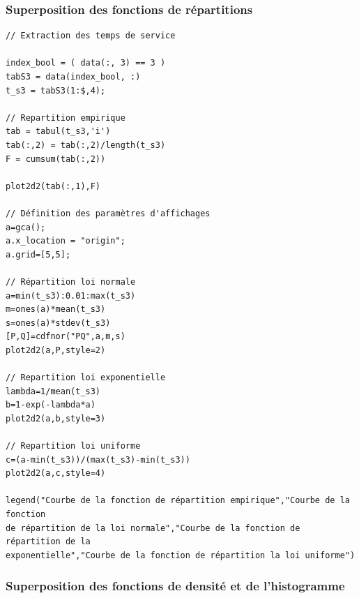 \documentclass{article}
\begin{document}
\subsubsection{Superposition des fonctions de répartitions}
\begin{verbatim}
// Extraction des temps de service

index_bool = ( data(:, 3) == 3 )
tabS3 = data(index_bool, :)
t_s3 = tabS3(1:$,4);

// Repartition empirique
tab = tabul(t_s3,'i')
tab(:,2) = tab(:,2)/length(t_s3)
F = cumsum(tab(:,2))

plot2d2(tab(:,1),F)

// Définition des paramètres d'affichages
a=gca();
a.x_location = "origin";
a.grid=[5,5];

// Répartition loi normale
a=min(t_s3):0.01:max(t_s3)
m=ones(a)*mean(t_s3)
s=ones(a)*stdev(t_s3)
[P,Q]=cdfnor("PQ",a,m,s)
plot2d2(a,P,style=2)

// Repartition loi exponentielle
lambda=1/mean(t_s3)
b=1-exp(-lambda*a)
plot2d2(a,b,style=3)

// Repartition loi uniforme
c=(a-min(t_s3))/(max(t_s3)-min(t_s3))
plot2d2(a,c,style=4)

legend("Courbe de la fonction de répartition empirique","Courbe de la fonction 
de répartition de la loi normale","Courbe de la fonction de répartition de la 
exponentielle","Courbe de la fonction de répartition la loi uniforme")
\end{verbatim}

\subsubsection{Superposition des fonctions de densité et de l'histogramme}
\begin{verbatim}
\end{verbatim}



\begin{verbatim}
\end{verbatim}
\end{document}
